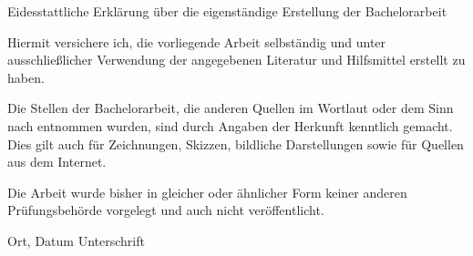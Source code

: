 
\thispagestyle{empty}
\raggedright
\begin{center}
\huge{Eidesstattliche Erklärung über die eigenständige Erstellung der Bachelorarbeit }\\
\vspace{15 mm}
\normalsize
\end{center}

Hiermit versichere ich, die vorliegende Arbeit selbständig und unter
ausschließlicher Verwendung der angegebenen Literatur und Hilfsmittel erstellt
zu haben.

Die Stellen der Bachelorarbeit, die anderen Quellen im Wortlaut oder
dem Sinn nach entnommen wurden, sind durch Angaben der Herkunft kenntlich
gemacht.
Dies gilt auch für Zeichnungen, Skizzen, bildliche Darstellungen sowie für
Quellen aus dem Internet.

Die Arbeit wurde bisher in gleicher oder ähnlicher Form keiner anderen
Prüfungsbehörde vorgelegt und auch nicht veröffentlicht.

\vspace{25 mm}


\hrulefill \hfill \hrulefill

Ort, Datum \hfill Unterschrift